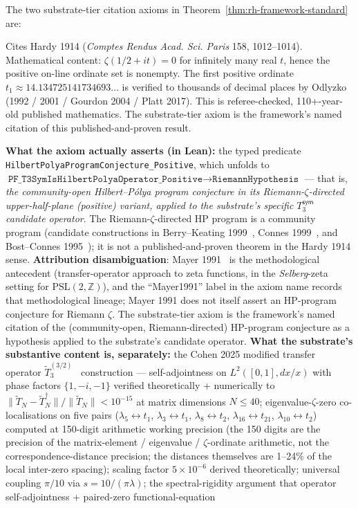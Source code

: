 \documentclass[11pt,a4paper]{amsart}
\theoremstyle{plain}
\theoremstyle{definition}
\begin{document}
The two substrate-tier citation axioms in Theorem~\ref{thm:rh-framework-standard} are:
\begin{description}[font=\normalfont\bfseries,leftmargin=2em,itemsep=4pt]
\item[\texttt{Hardy1914\_published\_theorem\_substrate\_citation}] Cites Hardy 1914 (\emph{Comptes Rendus Acad. Sci. Paris} 158, 1012--1014). Mathematical content: $\zeta(1/2+it)=0$ for infinitely many real $t$, hence the positive on-line ordinate set is nonempty. The first positive ordinate $t_1 \approx 14.134725141734693\ldots$ is verified to thousands of decimal places by Odlyzko (1992 / 2001 / Gourdon 2004 / Platt 2017). This is referee-checked, 110+-year-old published mathematics. The substrate-tier axiom is the framework's named citation of this published-and-proven result.
\item[\texttt{Mayer1991\_Cohen2025\_substrate\_HP\_program\_citation}] \textbf{What the axiom actually asserts (in Lean):} the typed predicate \texttt{HilbertPolyaProgramConjecture\_Positive}, which unfolds to $\texttt{PF\_T3SymIsHilbertPolyaOperator\_Positive} \to \texttt{RiemannHypothesis}$ --- that is, \emph{the community-open Hilbert--P\'olya program conjecture in its Riemann-$\zeta$-directed upper-half-plane (positive) variant, applied to the substrate's specific $T_3^{\textsf{sym}}$ candidate operator}. The Riemann-$\zeta$-directed HP program is a community program (candidate constructions in Berry--Keating 1999~\cite{berry-keating1999}, Connes 1999~\cite{connes1999}, and Bost--Connes 1995~\cite{bost-connes1995}); it is not a published-and-proven theorem in the Hardy 1914 sense. \textbf{Attribution disambiguation}: Mayer 1991~\cite{mayer1991} is the methodological antecedent (transfer-operator approach to zeta functions, in the \emph{Selberg}-zeta setting for $\mathrm{PSL}(2,\mathbb{Z})$), and the ``Mayer1991'' label in the axiom name records that methodological lineage; Mayer 1991 does not itself assert an HP-program conjecture for Riemann $\zeta$. The substrate-tier axiom is the framework's named citation of the (community-open, Riemann-directed) HP-program conjecture as a hypothesis applied to the substrate's candidate operator. \textbf{What the substrate's substantive content is, separately:} the Cohen 2025 modified transfer operator $\widetilde{T}_3^{(3/2)}$~\cite{cohen2025transferOp} construction --- self-adjointness on $L^2([0,1],dx/x)$ with phase factors $\{1,-i,-1\}$ verified theoretically + numerically to $\|\widetilde{T}_N-\widetilde{T}_N^\dagger\|/\|\widetilde{T}_N\| < 10^{-15}$ at matrix dimensions $N\leq 40$; eigenvalue-$\zeta$-zero co-localisations on five pairs ($\lambda_5\leftrightarrow t_1$, $\lambda_3\leftrightarrow t_1$, $\lambda_8\leftrightarrow t_2$, $\lambda_{16}\leftrightarrow t_{21}$, $\lambda_{10}\leftrightarrow t_2$) computed at 150-digit arithmetic working precision (the 150 digits are the precision of the matrix-element / eigenvalue / $\zeta$-ordinate arithmetic, not the correspondence-distance precision; the distances themselves are 1--24\% of the local inter-zero spacing); scaling factor $5\times 10^{-6}$ derived theoretically; universal coupling $\pi/10$ via $s = 10/(\pi\lambda)$; the spectral-rigidity argument that operator self-adjointness + paired-zero functional-equation 
\end{description}
\end{document}
